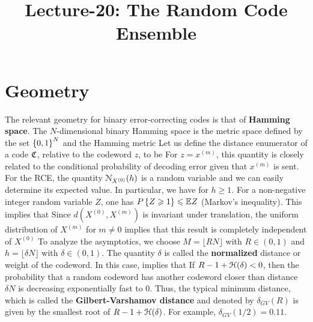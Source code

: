 \documentclass[letterpaper,english,10pt]{article}
\title{Lecture-20: The Random Code Ensemble}
\begin{document}
\maketitle

\section{Geometry}

The relevant geometry for binary error-correcting codes is that of \textbf{Hamming space}. 
The $N$-dimensional binary Hamming space is the metric space defined by the set  $\left\{0,1\right\}^N$ and the Hamming metric
Let us define the distance enumerator of a code $\mathfrak{C}$, relative to the codeword $z$, to be
For $ z = x^{(m)}$, this quantity is closely related to the conditional probability of decoding error given that $x^{(m)}$ is sent.
For the RCE, the quantity $\mathcal{N}_{X^{(0)}}(h)$ is a random variable and we can easily determine its expected value. 
In particular, we have 
for $h  \ge 1$. 
For a non-negative integer random variable $Z$, one has $P\left\{Z \geqslant 1\right\} \leqslant \mathbb{E} Z$ (Markov's inequality). 
This implies that
Since $d(X^{(0)},X^{(m)})$ is invariant under translation, 
the uniform distribution of $X^{(m)}$ for $m \neq 0$ implies that this result is completely independent of $X^{(0)}$
To analyze the asymptotics, we choose $M=\lfloor RN\rfloor$ with $R \in (0,1)$ and $h = \lfloor\delta N\rfloor$ with
$\delta \in (0,1)$. 
The quantity $\delta$ is called the \textbf{normalized} distance or weight of the codeword. 
In this case, 
implies that 
If $R-1+\mathcal{H}(\delta) < 0$, then the probability that a random codeword has another codeword closer than distance $\delta N$ is decreasing exponentially fast to $0$. 
Thus, the typical minimum distance, which is called the \textbf{Gilbert-Varshamov distance} and denoted by $\delta_{GV}(R)$ is given by the smallest root of $R-1+\mathcal{H}(\delta)$. 
For example, $\delta_{GV}(1/2) = 0.11$. 
\end{document}
